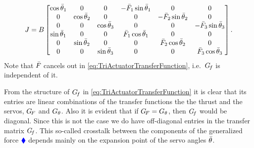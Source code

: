 \begin{align}
 J = B
 \begin{bmatrix}
  \cos\aServoStat[1] & 0 & 0 & -\PropForceStat[1] \sin\aServoStat[1] & 0 & 0 \\
  0 & \cos\aServoStat[2] & 0 & 0 & -\PropForceStat[2] \sin\aServoStat[2] & 0 \\
  0 & 0 & \cos\aServoStat[3] & 0 & 0 & -\PropForceStat[3] \sin\aServoStat[3] \\
  \sin\aServoStat[1] & 0 & 0 & \PropForceStat[1] \cos\aServoStat[1] & 0 & 0 \\
  0 & \sin\aServoStat[2] & 0 & 0 & \PropForceStat[2] \cos\aServoStat[2] & 0 \\
  0 & 0 & \sin\aServoStat[3] & 0 & 0 & \PropForceStat[3] \cos\aServoStat[3] \\
 \end{bmatrix}
 .
\end{align}
Note that $\PropForceStat$ cancels out in \eqref{eq:TriActuatorTransferFunction}, i.e.\ $\GenForceTransferFunction$ is independent of it.

From the structure of $\GenForceTransferFunction$ in \eqref{eq:TriActuatorTransferFunction} it is clear that its entries are linear combinations of the transfer functions the the thrust and the servos, $\ThrustTransferFunction$ and $\ServoTransferFunction$.
Also it is evident that if $\ThrustTransferFunction = \ServoTransferFunction$, then $\GenForceTransferFunction$ would be diagonal.
Since this is not the case we do have off-diagonal entries in the transfer matrix $\GenForceTransferFunction$.
This so-called crosstalk between the components of the generalized force $\genForce$ depends mainly on the expansion point of the servo angles $\aServoStat$.


